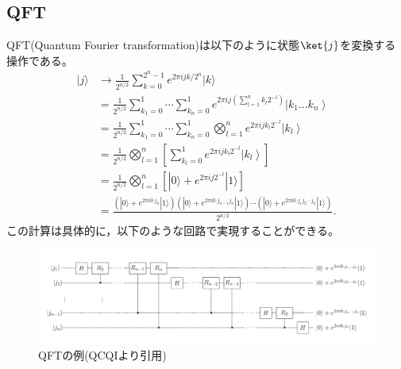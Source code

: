 \documentclass[b5paper,papersize,dvipdfmx,fleqn]{jsarticle}
\begin{document}
\subsection{QFT}
QFT(Quantum Fourier transformation)は以下のように状態$\ket{j}$を変換する操作である。
$$
\begin{aligned}
|j\rangle & \rightarrow \frac{1}{2^{n / 2}} \sum_{k=0}^{2^{n}-1} e^{2 \pi i j k / 2^{n}}|k\rangle \\
&=\frac{1}{2^{n / 2}} \sum_{k_{1}=0}^{1} \cdots \sum_{k_{n}=0}^{1} e^{2 \pi i j\left(\sum_{l=1}^{n} k_{l} 2^{-l}\right)}\left|k_{1} \ldots k_{n}\right\rangle \\
&=\frac{1}{2^{n / 2}} \sum_{k_{1}=0}^{1} \cdots \sum_{k_{n}=0}^{1} \bigotimes_{l=1}^{n} e^{2 \pi i j k_{l} 2^{-l}}\left|k_{l}\right\rangle \\
&=\frac{1}{2^{n / 2}} \bigotimes_{l=1}^{n}\left[\sum_{k_{l}=0}^{1} e^{2 \pi i j k_{l} 2^{-l}}\left|k_{l}\right\rangle\right] \\
&=\frac{1}{2^{n / 2}} \bigotimes_{l=1}^{n}\left[|0\rangle+e^{2 \pi i j 2^{-l}}|1\rangle\right] \\
&=\frac{\left(|0\rangle+e^{2 \pi i 0 . j_{n}}|1\rangle\right)\left(|0\rangle+e^{2 \pi i 0 . j_{n-1} j_{n}}|1\rangle\right) \cdots\left(|0\rangle+e^{2 \pi i 0 . j_{1} j_{2} \cdots j_{n}}|1\rangle\right)}{2^{n / 2}} .
\end{aligned}
$$
この計算は具体的に，以下のような回路で実現することができる。
\begin{center}
  \begin{figure}[H]
       \includegraphics[width=\textwidth]{qft.pdf}
       \caption{QFTの例(QCQIより引用)}
       \label{circuit}
  \end{figure}
\end{center}
\end{document}
